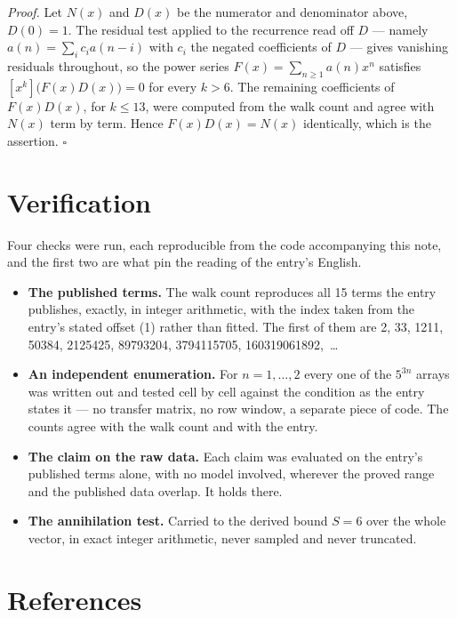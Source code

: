 \documentclass[11pt]{article}
\theoremstyle{definition}
\begin{document}
{\itshape Proof.} Let $N(x)$ and $D(x)$ be the numerator and denominator above, $D(0)=1$. The residual test applied to the recurrence read off $D$ --- namely $a(n) = \sum_i c_i a(n-i)$ with $c_i$ the negated coefficients of $D$ --- gives vanishing residuals throughout, so the power series $F(x)=\sum_{n\ge 1}a(n)x^n$ satisfies $[x^k]\bigl(F(x)D(x)\bigr) = 0$ for every $k > 6$. The remaining coefficients of $F(x)D(x)$, for $k \le 13$, were computed from the walk count and agree with $N(x)$ term by term. Hence $F(x)D(x) = N(x)$ identically, which is the assertion. $\square$

\section{Verification}

Four checks were run, each reproducible from the code accompanying this note, and the first two are what pin the reading of the entry's English.

\begin{itemize}

\item {\bfseries The published terms.} The walk count reproduces all 15 terms the entry publishes, exactly, in integer arithmetic, with the index taken from the entry's stated offset (1) rather than fitted. The first of them are 2, 33, 1211, 50384, 2125425, 89793204, 3794115705, 160319061892,~\dots

\item {\bfseries An independent enumeration.} For $n = 1,\dots,2$ every one of the $5^{3n}$ arrays was written out and tested cell by cell against the condition as the entry states it --- no transfer matrix, no row window, a separate piece of code. The counts agree with the walk count and with the entry.

\item {\bfseries The claim on the raw data.} Each claim was evaluated on the entry's published terms alone, with no model involved, wherever the proved range and the published data overlap. It holds there.

\item {\bfseries The annihilation test.} Carried to the derived bound $S = 6$ over the whole vector, in exact integer arithmetic, never sampled and never truncated.

\end{itemize}

\section{References}
\end{document}
